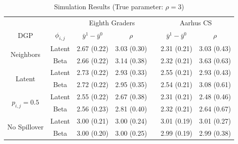 \documentclass{article}
\begin{document}
\begin{table}[htbp]
  \caption{Simulation Results (True parameter: $\rho = 3$)}
  \label{table1}
  \centering
  \begin{tabular}{ccccccc}
    \toprule
    & & \multicolumn{2}{c}{Eighth Graders} & & \multicolumn{2}{c}{Aarhus CS}              \\
    \cmidrule{3-4} \cmidrule{6-7}
    DGP & $\phi_{i,j}$ & $\bar{y}^1 - \bar{y}^0$ & $\rho$ & & $\bar{y}^1 - \bar{y}^0$ & $\rho$ \\
    \midrule
    \multirow{ 2}{*}{Neighbors} & Latent & 2.67 (0.22) & 3.03 (0.30) & & 2.31 (0.21) & 3.03 (0.43)    \\
    \cmidrule{2-7}
    & Beta & 2.66 (0.22) & 3.14 (0.38) & & 2.32 (0.21) & 3.63 (0.63)  \\
    \midrule
    \multirow{ 2}{*}{Latent}& Latent & 2.73 (0.22) & 2.93 (0.33)  & & 2.55 (0.21) & 2.93 (0.43)  \\
    \cmidrule{2-7}
    & Beta  & 2.72 (0.22) & 2.95 (0.35)  & & 2.54 (0.21) & 3.08 (0.61) \\
    \midrule
    \multirow{ 2}{*}{$p_{i,j} = 0.5$}& Latent & 2.55 (0.22) & 2.67 (0.38)  & & 2.31 (0.21) & 2.48 (0.46) \\
    \cmidrule{2-7} 
    & Beta  & 2.56 (0.23)& 2.81 (0.40)  & & 2.32 (0.21) & 2.64 (0.67)  \\
    \midrule
    \multirow{ 2}{*}{No Spillover}& Latent & 3.00 (0.21) & 3.00 (0.24)  & & 3.01 (0.19) & 3.01 (0.27) \\
    \cmidrule{2-7} 
    & Beta  & 3.00 (0.20) & 3.00 (0.25)  & & 2.99 (0.19) & 2.99 (0.38)  \\
    \bottomrule
  \end{tabular}
\end{table}
\end{document}
